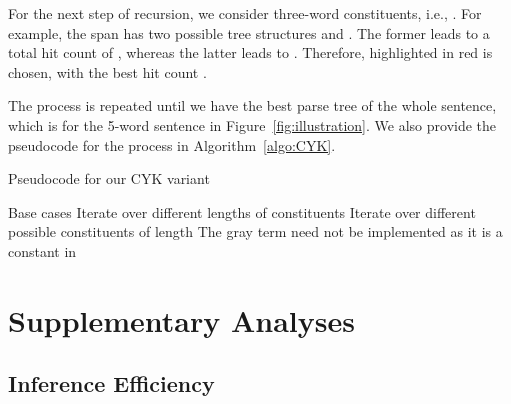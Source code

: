 \documentclass{article}
\begin{document}
For the next step of recursion, we consider three-word constituents, i.e., . For example, the span  has two possible tree structures  and . The former leads to a total hit count of , whereas the latter leads to . Therefore,  highlighted in red is chosen, with the best hit count .

The process is repeated until we have the best parse tree of the whole sentence, which is  for the 5-word sentence in Figure~\ref{fig:illustration}. We also provide the pseudocode for the process in Algorithm~\ref{algo:CYK}.

\begin{algorithm}[!t]
\caption{Pseudocode for our CYK variant}
\label{algo:CYK}
\begin{algorithmic}[1]
      Base cases
        \State 
        \State 
    \EndFor
     Iterate over different lengths of constituents
          Iterate over different possible constituents of length 
            \State 
            \State 
        \Statex \hspace{4cm} The {\color{gray}gray} term need not be implemented as it is a constant in 
            \State 
            \State 
        \EndFor
    \EndFor
    \State \Return 
\EndFunction
\end{algorithmic}
\end{algorithm}

\section{Supplementary Analyses}
\label{app:additional}

\subsection{Inference Efficiency}\label{app:efficiency}
\end{document}
